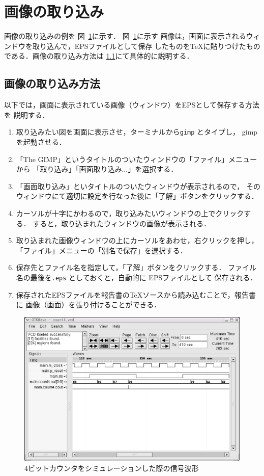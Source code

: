 \documentclass{jarticle}[11pt]
\begin{document}
\section{画像の取り込み}
画像の取り込みの例を
図~\ref{fig:4ビットカウンタをシミュレーションした際の信号波形}に示す．
図~\ref{fig:4ビットカウンタをシミュレーションした際の信号波形}に示す
画像は，画面に表示されるウィンドウを取り込んで，EPSファイルとして保存
したものをTeXに貼りつけたものである．画像の取り込み方法は
\ref{subsec:画像の取り込み方法}にて具体的に説明する．

\subsection{画像の取り込み方法}
\label{subsec:画像の取り込み方法}
以下では，画面に表示されている画像（ウィンドウ）をEPSとして保存する方法を
説明する．
\begin{enumerate}
\item 取り込みたい図を画面に表示させ，ターミナルから{\tt gimp} とタイプし，
gimp を起動させる．
\item 「The GIMP」というタイトルのついたウィンドウの「ファイル」メニューから
「取り込み」「画面取り込み...」を選択する．
\item 「画面取り込み」といタイトルのついたウィンドウが表示されるので，
そのウィンドウにて適切に設定を行なった後に「了解」ボタンをクリックする．
\item カーソルが十字にかわるので，取り込みたいウィンドウの上でクリックする．
すると，取り込まれたウィンドウの画像が表示される．
\item 取り込まれた画像ウィンドウの上にカーソルをあわせ，右クリックを押し，
「ファイル」メニューの「別名で保存」を選択する．
\item 保存先とファイル名を指定して，「了解」ボタンをクリックする．
ファイル名の最後を{\tt .eps} としておくと，自動的に EPSファイルとして
保存される．
\item 保存されたEPSファイルを報告書のTeXソースから読み込むことで，報告書に
画像（画面）を張り付けることができる．
\end{enumerate}


\begin{figure}[htbp]
\begin{center}
\includegraphics[scale=0.5]{count4_gtkwave.eps}
\caption{4ビットカウンタをシミュレーションした際の信号波形}
\label{fig:4ビットカウンタをシミュレーションした際の信号波形}
\end{center}
\end{figure}
\end{document}
